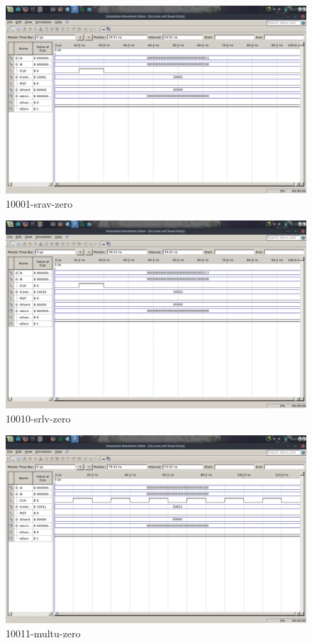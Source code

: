 \documentclass[12pt]{article}
\begin{document}
\begin{figure}[H]
	\centering
	\includegraphics[width=.8\textwidth]{10001-srav-zero.png}
	\caption{10001-srav-zero}
	\label{fig:10001-srav-zero}
\end{figure}

\begin{figure}[H]
	\centering
	\includegraphics[width=.8\textwidth]{10010-srlv-zero.png}
	\caption{10010-srlv-zero}
	\label{fig:10010-srlv-zero}
\end{figure}

\begin{figure}[H]
	\centering
	\includegraphics[width=.8\textwidth]{10011-multu-zero.png}
	\caption{10011-multu-zero}
	\label{fig:10011-multu-zero}
\end{figure}
\end{document}
